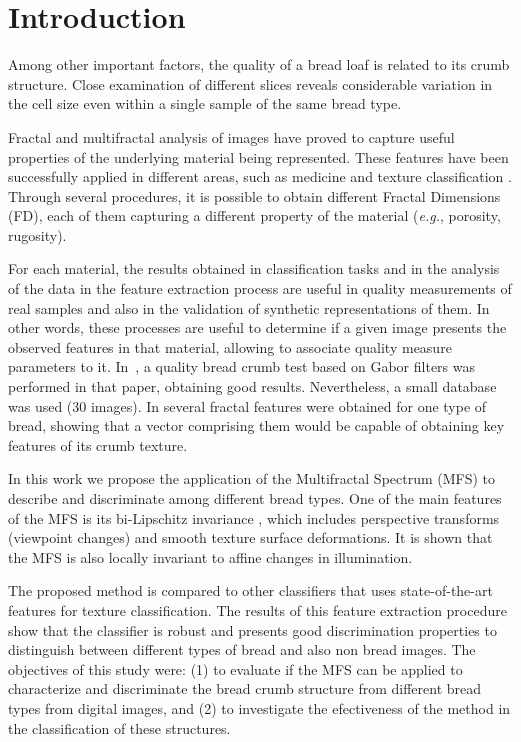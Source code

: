 \section{Introduction}
\label{intro}
Among other important factors, the quality of a bread loaf is related to its crumb structure. Close examination of different slices reveals considerable variation in the cell size even within a single sample of the same bread type. 

Fractal and multifractal analysis of images have proved to capture useful properties of the underlying material being represented. These features have been successfully applied in different areas, such as medicine \cite{Andjelkovic2008,Yu2011} and texture classification \cite{Wendt2009}. Through several procedures, it is possible to obtain different Fractal Dimensions (FD), each of them capturing a different property of the material ({\em e.g.}, porosity, rugosity).

For each material, the results obtained in classification tasks and in the analysis of the data in the feature extraction process are useful in quality measurements of real samples and also in the validation of synthetic representations of them. In other words, these processes are useful to determine if a given image presents the observed features in that material, allowing to associate quality measure parameters to it. In~\cite{Fan2006}, a quality bread crumb test based on Gabor filters was performed in that paper, obtaining good results. Nevertheless, a small database was used ($30$ images). In \cite{Gonzales2008} several fractal features were obtained for one type of bread, showing that a vector comprising them would be capable of obtaining key features of its crumb texture.

In this work we propose the application of the Multifractal Spectrum (MFS) \cite{Xu2006} to describe and discriminate among different bread types. One of the main features of the MFS is its bi-Lipschitz invariance \cite{bilipXXX}, which includes perspective transforms (viewpoint changes) and smooth texture surface deformations. It is shown that the MFS is also locally invariant to affine changes in illumination.

The proposed method is compared to other classifiers that uses state-of-the-art features for texture classification. The results of this feature extraction procedure show that the classifier is robust and presents good discrimination properties to distinguish between different types of bread and also non bread images. The objectives of this study were: (1) to evaluate if the MFS can be applied to characterize and discriminate the bread crumb structure from different bread types from digital images, and (2) to investigate the efectiveness of the method in the classification of these structures.

